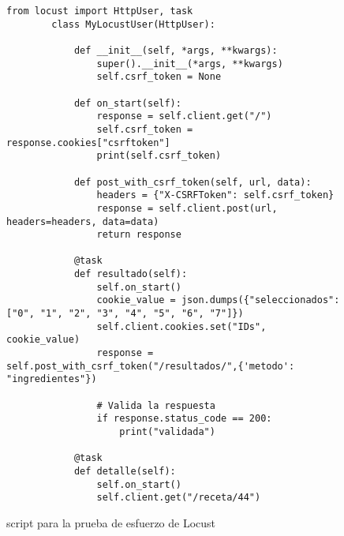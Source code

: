 \begin{figure}[H]
    \begin{lstlisting}[style=python]
        from locust import HttpUser, task
        class MyLocustUser(HttpUser):

            def __init__(self, *args, **kwargs):
                super().__init__(*args, **kwargs)
                self.csrf_token = None

            def on_start(self):
                response = self.client.get("/")
                self.csrf_token = response.cookies["csrftoken"]
                print(self.csrf_token)

            def post_with_csrf_token(self, url, data):
                headers = {"X-CSRFToken": self.csrf_token}
                response = self.client.post(url, headers=headers, data=data)
                return response
            
            @task
            def resultado(self):
                self.on_start()
                cookie_value = json.dumps({"seleccionados": ["0", "1", "2", "3", "4", "5", "6", "7"]})
                self.client.cookies.set("IDs", cookie_value)
                response = self.post_with_csrf_token("/resultados/",{'metodo': "ingredientes"})

                # Valida la respuesta
                if response.status_code == 200:
                    print("validada")

            @task
            def detalle(self):
                self.on_start()
                self.client.get("/receta/44")
    \end{lstlisting}
    \caption{\Gls{script} para la prueba de esfuerzo de Locust}
    \label{sni:loadtest}
\end{figure}